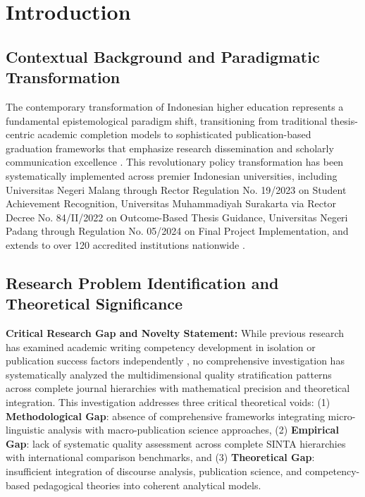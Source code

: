 \documentclass[journal,article,submit,pdftex,moreauthors]{Definitions/mdpi}
\begin{document}
\section{Introduction}

\subsection{Contextual Background and Paradigmatic Transformation}

The contemporary transformation of Indonesian higher education represents a fundamental epistemological paradigm shift, transitioning from traditional thesis-centric academic completion models to sophisticated publication-based graduation frameworks that emphasize research dissemination and scholarly communication excellence \citep{kemenristek2017,dikti2019}. This revolutionary policy transformation has been systematically implemented across premier Indonesian universities, including Universitas Negeri Malang through Rector Regulation No. 19/2023 on Student Achievement Recognition, Universitas Muhammadiyah Surakarta via Rector Decree No. 84/II/2022 on Outcome-Based Thesis Guidance, Universitas Negeri Padang through Regulation No. 05/2024 on Final Project Implementation, and extends to over 120 accredited institutions nationwide \citep{permendikbud2020,rosenfeldt2000}.

\subsection{Research Problem Identification and Theoretical Significance}

\textbf{Critical Research Gap and Novelty Statement:} While previous research has examined academic writing competency development in isolation \citep{hyland2000,connor1996} or publication success factors independently \citep{swales1990,hyland2005}, no comprehensive investigation has systematically analyzed the multidimensional quality stratification patterns across complete journal hierarchies with mathematical precision and theoretical integration. This investigation addresses three critical theoretical voids: (1) \textbf{Methodological Gap}: absence of comprehensive frameworks integrating micro-linguistic analysis with macro-publication science approaches, (2) \textbf{Empirical Gap}: lack of systematic quality assessment across complete SINTA hierarchies with international comparison benchmarks, and (3) \textbf{Theoretical Gap}: insufficient integration of discourse analysis, publication science, and competency-based pedagogical theories into coherent analytical models.
\end{document}
